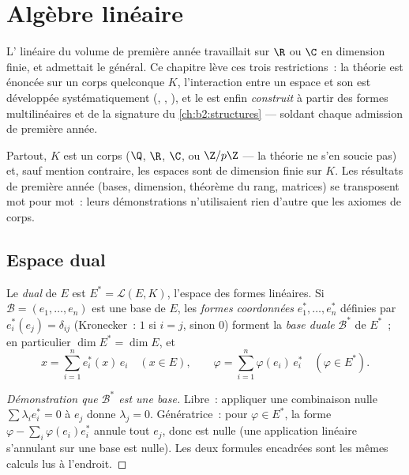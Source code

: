 \chapter{Algèbre linéaire}\label{ch:b2:linalg}

L' linéaire du volume de première année travaillait sur $\R$ ou
$\C$ en dimension finie, et admettait le  général. Ce
chapitre lève ces trois restrictions~: la théorie est énoncée sur un
corps quelconque $K$, l'interaction entre un espace et son
\emph{} est développée systématiquement (, ,
), et le  est enfin \emph{construit} à partir des
formes multilinéaires  et de la signature du
\cref{ch:b2:structures} --- soldant chaque admission de première année.

Partout, $K$ est un corps ($\Q$, $\R$, $\C$, ou $\Z/p\Z$ --- la
théorie ne s'en soucie pas) et, sauf mention contraire, les espaces
sont de dimension finie sur $K$. Les résultats de première année
(bases, dimension, théorème du rang, matrices) se transposent mot pour
mot~: leurs démonstrations n'utilisaient rien d'autre que les axiomes
de corps.

\section{Espace dual}

\begin{definition}\label{def:b2:linalg:dual}
Le \emph{dual} de $E$ est $E^* = \mathcal{L}(E,
K)$, l'espace des formes linéaires. Si $\mathcal{B} = (e_1, \dots, e_n)$
est une base de $E$, les \emph{formes coordonnées} $e_1^*, \dots, e_n^*$
définies par $e_i^*(e_j) = \delta_{ij}$ (Kronecker~: $1$ si $i = j$,
sinon $0$) forment la \emph{base duale}
$\mathcal{B}^*$ de $E^*$~; en particulier $\dim E^* = \dim E$, et
\[
x = \sum_{i=1}^{n} e_i^*(x)\, e_i \quad (x \in E),
\qquad
\varphi = \sum_{i=1}^{n} \varphi(e_i)\, e_i^* \quad (\varphi \in
E^*).
\]
\end{definition}

\begin{proof}[Démonstration que $\mathcal{B}^*$ est une base]
Libre~: appliquer une combinaison nulle $\sum \lambda_i e_i^* = 0$ à
$e_j$ donne $\lambda_j = 0$. Génératrice~: pour $\varphi \in E^*$, la
forme $\varphi - \sum_i \varphi(e_i) e_i^*$ annule tout $e_j$, donc
est nulle (une application linéaire s'annulant sur une base est nulle).
Les deux formules encadrées sont les mêmes calculs lus à l'endroit.
\end{proof}

